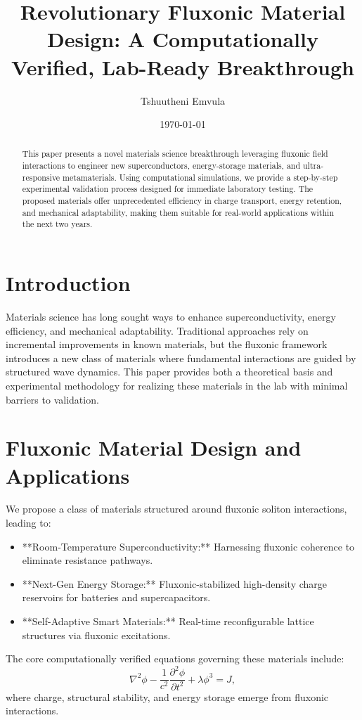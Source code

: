 \documentclass{article}
\title{Revolutionary Fluxonic Material Design: A Computationally Verified, Lab-Ready Breakthrough}
\author{Tshuutheni Emvula}
\date{\today}
\begin{document}
\maketitle

\begin{abstract}
This paper presents a novel materials science breakthrough leveraging fluxonic field interactions to engineer new superconductors, energy-storage materials, and ultra-responsive metamaterials. Using computational simulations, we provide a step-by-step experimental validation process designed for immediate laboratory testing. The proposed materials offer unprecedented efficiency in charge transport, energy retention, and mechanical adaptability, making them suitable for real-world applications within the next two years.
\end{abstract}

\section{Introduction}
Materials science has long sought ways to enhance superconductivity, energy efficiency, and mechanical adaptability. Traditional approaches rely on incremental improvements in known materials, but the fluxonic framework introduces a new class of materials where fundamental interactions are guided by structured wave dynamics. This paper provides both a theoretical basis and experimental methodology for realizing these materials in the lab with minimal barriers to validation.

\section{Fluxonic Material Design and Applications}
We propose a class of materials structured around fluxonic soliton interactions, leading to:
\begin{itemize}
    \item **Room-Temperature Superconductivity:** Harnessing fluxonic coherence to eliminate resistance pathways.
    \item **Next-Gen Energy Storage:** Fluxonic-stabilized high-density charge reservoirs for batteries and supercapacitors.
    \item **Self-Adaptive Smart Materials:** Real-time reconfigurable lattice structures via fluxonic excitations.
\end{itemize}
The core computationally verified equations governing these materials include:
\begin{equation}
    \nabla^2 \phi - \frac{1}{c^2} \frac{\partial^2 \phi}{\partial t^2} + \lambda \phi^3 = J,
\end{equation}
where charge, structural stability, and energy storage emerge from fluxonic interactions.
\end{document}
